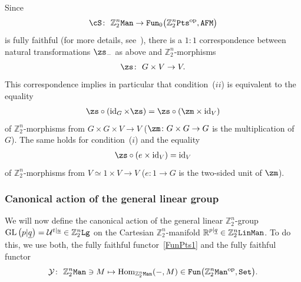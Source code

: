 \documentclass[10pt,a4paper]{amsart}
\newcommand{\op}[1]{\operatorname{#1}}
\newcommand{\R}{{\mathbb R}}
\newcommand{\Z}{{\mathbb Z}}
\def\ul{\underline}
\def\ul{\underline}
\newcommand{\0}{\otimes}
\newcommand{\id}{\op{id}}
\newcommand{\z}{\Z_2^n}
\numberwithin{equation}{section}
\begin{document}
Since
\begin{gather}\label{FunPts1}
\cS\colon\ \z{\tt Man}\to{\tt Fun}_0\big(\z{\tt Pts}^{\op{op}},{\tt AFM}\big)
\end{gather}
is fully faithful (for more details, see~\cite{Bruce:2019b,Bruce:2018,Bruce:2019}), there is a $1:1$ correspondence between natural transformations $\zs_-$ as above and $\z$-morphisms
\[%
\zs\colon\ G\times V\to V.
\]
This correspondence implies in particular that condition~($ii$) is equivalent to the equality
\begin{gather}\label{Act1}
\zs\circ(\id_G\times\zs)=\zs\circ(\zm\times\id_V)
\end{gather}
of $\z$-morphisms from $G\times G\times V\to V$ ($\zm\colon G\times G\to G$ is the multiplication of $G$). The same holds for condition~($i$) and the equality
\begin{gather}\label{Act2}
\zs\circ(e\times \id_V)=\id_V
\end{gather}
of $\z$-morphisms from $V\simeq 1\times V\to V$ ($e\colon 1\to G$ is the two-sided unit of $\zm$).

\subsubsection{Canonical action of the general linear group} We will now define the canonical action of the general linear $\z$-group $\op{GL}\big(p|\ul q\big)=\mathcal{U}^{t|\ul u}\in\z{\tt Lg}$ on the Cartesian $\z$-manifold $\R^{p|\ul q}\in\z{\tt LinMan}$. To do this, we use both, the fully faithful functor~\eqref{FunPts1} and the fully faithful functor
\begin{gather}\label{FunPts2}
\mathcal{Y}\colon\ \z{\tt Man}\ni M\mapsto\op{Hom}_{\z{\tt Man}}(-,M)\in{\tt Fun}\big(\z{\tt Man}^{\op{op}},{\tt Set}\big).
\end{gather}
\end{document}
